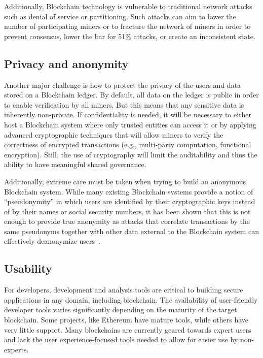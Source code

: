 Additionally, Blockchain technology is vulnerable to traditional network attacks such as denial of service or partitioning.  Such attacks can aim to lower the number of participating miners or to fracture the network of miners in order to prevent consensus, lower the bar for 51\% attacks, or create an inconsistent state.

\subsection{Privacy and anonymity}
Another major challenge is how to protect the privacy of the users and data stored on a Blockchain ledger.  By default, all data on the ledger is public in order to enable verification by all miners.  But this means that any sensitive data is inherently non-private. If confidentiality is needed, it will be necessary to either host a Blockchain system where only trusted entities can access it or by applying advanced cryptographic techniques that will allow miners to verify the correctness of encrypted transactions (e.g., multi-party computation, functional encryption). Still, the use of cryptography will limit the auditability and thus the ability to have meaningful shared governance.

Additionally, extreme care must be taken when trying to build an anonymous Blockchain system.
While many existing Blockchain systems provide a notion of ``pseudonymity'' in which users are identified by their cryptographic keys instead of by their names or social security numbers, it has been shown that this is not enough to provide true anonymity as attacks that correlate transactions by the same pseudonyms together with other data external to the Blockchain system can effectively deanonymize users~\cite{DBLP:journals/corr/abs-1708-04748}.

\subsection{Usability} %
For developers, development and analysis tools are critical to building secure applications in any domain, including blockchain. The availability of user-friendly developer tools varies significantly depending on the maturity of the target blockchain. Some projects, like Ethereum have mature tools, while others have very little support. Many blockchains are currently geared towards expert users and lack the user experience-focused tools needed to allow for easier use by non-experts.

